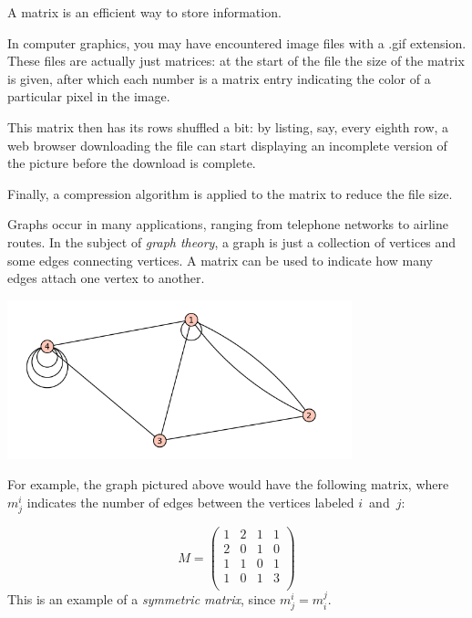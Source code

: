 A matrix is  an efficient way to store information.

\begin{example}
In computer graphics, you may have encountered image files with a .gif extension.  These files are actually just matrices: at the start of the file the size of the matrix is given, after which each number is a matrix entry  indicating the color of a particular pixel in the image.

This matrix  then has its rows shuffled a bit: by listing, say, every eighth row, a web browser downloading the file can start displaying an incomplete version of the picture before the download is complete.

Finally, a compression algorithm is applied to the matrix to reduce the file size.
\end{example}



\begin{example}
Graphs occur in many applications, ranging from telephone networks to airline routes.  In the subject of \emph{graph theory}, a graph is just a collection of vertices and some edges connecting vertices.  A matrix can be used to indicate how many edges attach one vertex to another.

\begin{center}
\includegraphics[width=10cm]{notes8-0.png}
\end{center}
For example, the graph pictured above would have the following matrix, where $m^i_j$ indicates the number of edges between the vertices labeled $i$~and~$j$:

\[
M = \begin{pmatrix}
1 & 2 & 1 & 1 \\
2 & 0 & 1 & 0 \\
1 & 1 & 0 & 1 \\
1 & 0 & 1 & 3 \\
\end{pmatrix}
\]
This is an example of a \emph{symmetric matrix}, since $m_j^i = m_i^j$.

\end{example}

